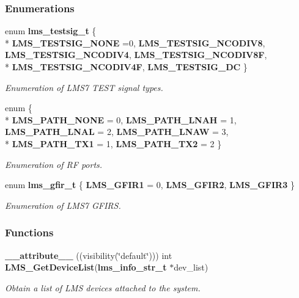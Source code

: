 \subsubsection*{Enumerations}
\begin{DoxyCompactItemize}
\item 
enum {\bf lms\+\_\+testsig\+\_\+t} \{ \\*
{\bf L\+M\+S\+\_\+\+T\+E\+S\+T\+S\+I\+G\+\_\+\+N\+O\+NE} =0, 
{\bf L\+M\+S\+\_\+\+T\+E\+S\+T\+S\+I\+G\+\_\+\+N\+C\+O\+D\+I\+V8}, 
{\bf L\+M\+S\+\_\+\+T\+E\+S\+T\+S\+I\+G\+\_\+\+N\+C\+O\+D\+I\+V4}, 
{\bf L\+M\+S\+\_\+\+T\+E\+S\+T\+S\+I\+G\+\_\+\+N\+C\+O\+D\+I\+V8F}, 
\\*
{\bf L\+M\+S\+\_\+\+T\+E\+S\+T\+S\+I\+G\+\_\+\+N\+C\+O\+D\+I\+V4F}, 
{\bf L\+M\+S\+\_\+\+T\+E\+S\+T\+S\+I\+G\+\_\+\+DC}
 \}\begin{DoxyCompactList}\small\item\em Enumeration of L\+M\+S7 T\+E\+ST signal types. \end{DoxyCompactList}
\item 
enum \{ \\*
{\bf L\+M\+S\+\_\+\+P\+A\+T\+H\+\_\+\+N\+O\+NE} = 0, 
{\bf L\+M\+S\+\_\+\+P\+A\+T\+H\+\_\+\+L\+N\+AH} = 1, 
{\bf L\+M\+S\+\_\+\+P\+A\+T\+H\+\_\+\+L\+N\+AL} = 2, 
{\bf L\+M\+S\+\_\+\+P\+A\+T\+H\+\_\+\+L\+N\+AW} = 3, 
\\*
{\bf L\+M\+S\+\_\+\+P\+A\+T\+H\+\_\+\+T\+X1} = 1, 
{\bf L\+M\+S\+\_\+\+P\+A\+T\+H\+\_\+\+T\+X2} = 2
 \}\begin{DoxyCompactList}\small\item\em Enumeration of RF ports. \end{DoxyCompactList}
\item 
enum {\bf lms\+\_\+gfir\+\_\+t} \{ {\bf L\+M\+S\+\_\+\+G\+F\+I\+R1} = 0, 
{\bf L\+M\+S\+\_\+\+G\+F\+I\+R2}, 
{\bf L\+M\+S\+\_\+\+G\+F\+I\+R3}
 \}\begin{DoxyCompactList}\small\item\em Enumeration of L\+M\+S7 G\+F\+I\+RS. \end{DoxyCompactList}
\end{DoxyCompactItemize}
\subsubsection*{Functions}
\begin{DoxyCompactItemize}
\item 
{\bf \+\_\+\+\_\+attribute\+\_\+\+\_\+} ((visibility(\char`\"{}default\char`\"{}))) int {\bf L\+M\+S\+\_\+\+Get\+Device\+List}({\bf lms\+\_\+info\+\_\+str\+\_\+t} $\ast$dev\+\_\+list)
\begin{DoxyCompactList}\small\item\em Obtain a list of L\+MS devices attached to the system. \end{DoxyCompactList}\end{DoxyCompactItemize}
